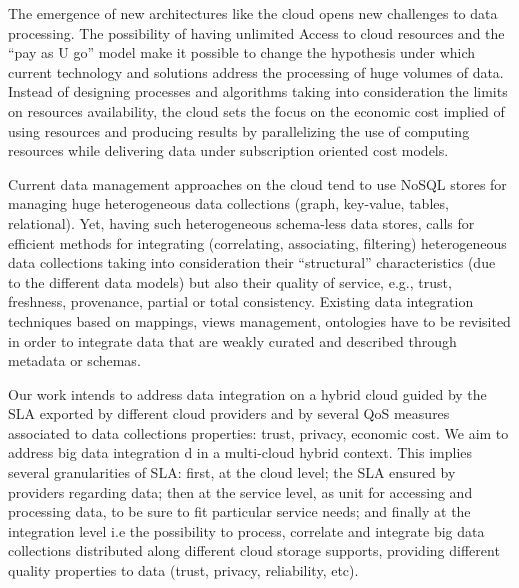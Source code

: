 The emergence of new architectures like the cloud opens new challenges to data processing. 
The possibility of having unlimited Access to cloud resources and the ``pay as U go'' model make it possible to change the hypothesis under which current technology and solutions address the processing of huge volumes of data. 
Instead of designing processes and algorithms taking into consideration the limits on resources availability, the cloud sets the focus on the economic cost implied of using resources and producing results by parallelizing the use of computing resources while delivering data under subscription oriented cost models.
 
Current data management approaches on the cloud tend to use NoSQL stores for managing huge heterogeneous data collections (graph, key-value, tables, relational). 
Yet, having such heterogeneous schema-less data stores, calls for efficient methods for integrating (correlating, associating, filtering) heterogeneous data collections taking into consideration their ``structural'' characteristics (due to the different data models) but also their quality of service, e.g., trust, freshness, provenance, partial or total consistency. 
Existing data integration techniques based on mappings, views management, ontologies have to be revisited in order to integrate data that are weakly curated and described through metadata or schemas.

 
Our work intends to address data integration on a hybrid cloud guided by the SLA exported by different cloud providers and by several QoS measures associated to data collections properties: trust, privacy, economic cost. 
We aim to address big data integration d in a multi-cloud hybrid context. 
This implies several granularities of SLA: first, at the cloud level; the SLA ensured by providers regarding data; then at the service level, as unit for accessing and processing data, to be sure to fit particular service needs; and finally at the integration level i.e the possibility to process, correlate and integrate big data collections distributed along different cloud storage supports, providing different quality properties to data (trust, privacy, reliability, etc).
  
